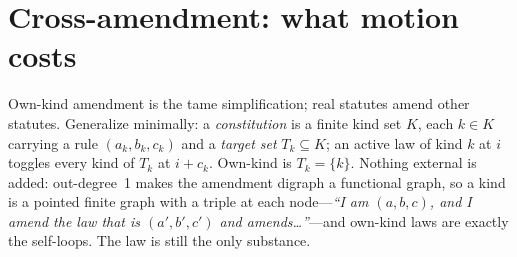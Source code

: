 \documentclass[10pt]{article}
\theoremstyle{definition}
\theoremstyle{remark}
\begin{document}
\section{Cross-amendment: what motion costs}
Own-kind amendment is the tame simplification; real statutes amend other
statutes. Generalize minimally: a \emph{constitution} is a finite kind set $K$,
each $k\in K$ carrying a rule $(a_k,b_k,c_k)$ and a \emph{target set}
$T_k\subseteq K$; an active law of kind $k$ at $i$ toggles every kind of $T_k$
at $i+c_k$. Own-kind is $T_k=\{k\}$. Nothing external is added: out-degree~1
makes the amendment digraph a functional graph, so a kind is a pointed finite
graph with a triple at each node---\emph{``I am $(a,b,c)$, and I amend the law
that is $(a',b',c')$ and amends\dots''}---and own-kind laws are exactly the
self-loops. The law is still the only substance.
\end{document}
